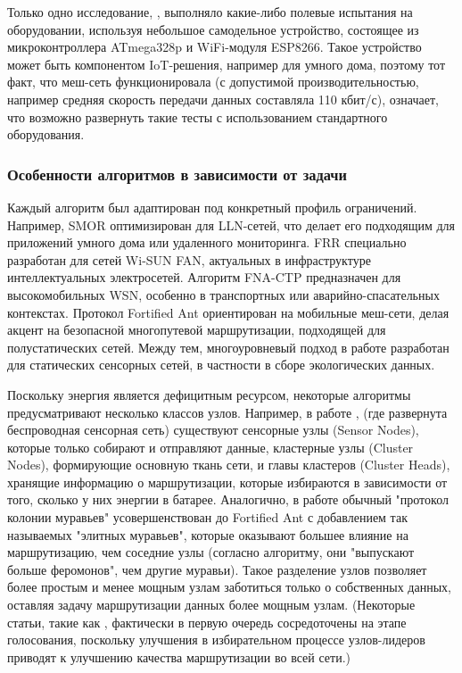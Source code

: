\documentclass[%
]{report}
\begin{document}
Только одно исследование,
\textcite{MUHENDRA2017332},
выполняло какие-либо полевые испытания на оборудовании,
используя небольшое самодельное устройство,
состоящее из микроконтроллера ATmega328p
и WiFi-модуля ESP8266.
Такое устройство может быть компонентом
IoT-решения, например для умного дома,
поэтому тот факт, что меш-сеть функционировала
(с допустимой производительностью, например
средняя скорость передачи данных составляла 110 кбит/с),
означает, что возможно развернуть такие
тесты с использованием стандартного оборудования.

\subsubsection{Особенности алгоритмов в зависимости от задачи}\label{specific-considerations-for-algorithm-usage-scope}

Каждый алгоритм был адаптирован под конкретный
профиль ограничений.
Например, SMOR оптимизирован для LLN-сетей, что
делает его подходящим для приложений
умного дома или удаленного мониторинга.
FRR специально разработан для сетей Wi-SUN FAN,
актуальных в инфраструктуре интеллектуальных электросетей.
Алгоритм FNA-CTP предназначен для высокомобильных WSN,
особенно в транспортных или аварийно-спасательных контекстах.
Протокол Fortified Ant ориентирован на мобильные меш-сети,
делая акцент на безопасной многопутевой маршрутизации,
подходящей для полустатических сетей.
Между тем, многоуровневый подход в работе
\textcite{ALVAREZ2008240}
разработан для статических сенсорных сетей,
в частности в сборе экологических данных.

Поскольку энергия является дефицитным ресурсом,
некоторые алгоритмы предусматривают несколько классов узлов.
Например, в работе \textcite{ZHENG2020443},
(где развернута беспроводная сенсорная сеть)
существуют сенсорные узлы (Sensor Nodes),
которые только собирают и отправляют данные,
кластерные узлы (Cluster Nodes),
формирующие основную ткань сети,
и главы кластеров (Cluster Heads),
хранящие информацию о маршрутизации,
которые избираются в зависимости от того,
сколько у них энергии в батарее.
Аналогично, в работе \textcite{LI2020570}
обычный "протокол колонии муравьев"
усовершенствован до Fortified Ant
с добавлением так называемых "элитных муравьев",
которые оказывают большее влияние на маршрутизацию,
чем соседние узлы (согласно алгоритму, они "выпускают больше феромонов", чем другие муравьи).
Такое разделение узлов позволяет более простым
и менее мощным узлам заботиться только о
собственных данных,
оставляя задачу маршрутизации данных
более мощным узлам.
(Некоторые статьи,
такие как \textcite{ALI2024102356},
фактически в первую очередь сосредоточены на этапе голосования,
поскольку улучшения в избирательном процессе узлов-лидеров
приводят к улучшению качества маршрутизации во всей сети.)
\end{document}
